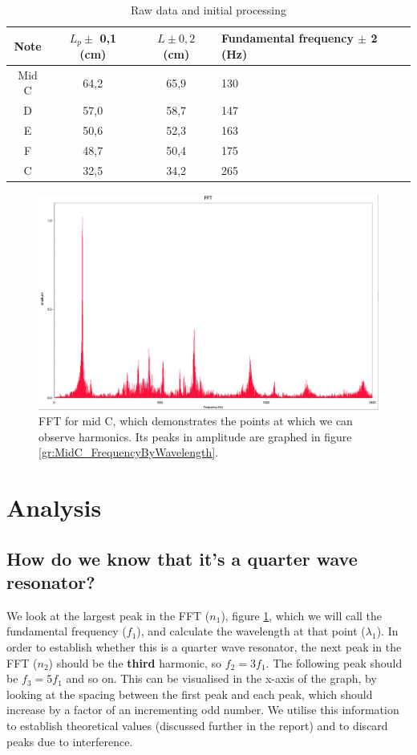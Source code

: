 \documentclass{article}
\begin{document}
\begin{table}[h!]
	\caption{Raw data and initial processing}
	\label{table:RawData}
	\begin{tabular}{| c c c p{2cm} |}
		\hline
		Note  & $ L_p \pm$ 0,1 (cm) & $L \pm 0,2$ (cm) & Fundamental frequency $\pm$ 2 (Hz)\\
		\hline
		Mid C & 64,2 & 65,9 & 130\\
		D     & 57,0 & 58,7 & 147 \\
		E     & 50,6 & 52,3 & 163 \\
		F     & 48,7 & 50,4 & 175 \\
		C     & 32,5 & 34,2 & 265 \\
		\hline
	\end{tabular}
\end{table}

\begin{figure}[h!]
	\caption{FFT for mid C, which demonstrates the points at which we can observe harmonics. Its peaks in amplitude are graphed in figure \protect \ref{gr:MidC_FrequencyByWavelength}.}
	\label {fig:FFTMidC}
	\includegraphics[scale=0.3]{fft.png}
\end{figure}
\pagebreak

\section*{Analysis}
\subsection*{How do we know that it's a quarter wave resonator?}
We look at the largest peak in the FFT ($n_1$), figure \ref{fig:FFTMidC}, which we will call the fundamental frequency ($f_1$), and calculate the wavelength at that point ($\lambda_1$). In order to establish whether this is a quarter wave resonator, the next peak in the FFT ($n_2$) should be the \textbf{third} harmonic, so $f_2 = 3f_1$. The following peak should be $f_3 = 5f_1$ and so on. This can be visualised in the x-axis of the graph, by looking at the spacing between the first peak and each peak, which should increase by a factor of an incrementing odd number. We utilise this information to establish theoretical values (discussed further in the report) and to discard peaks due to interference.
\end{document}

